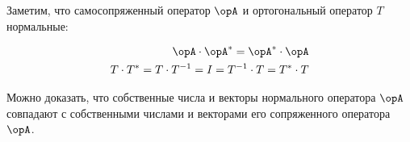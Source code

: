 \begin{remark}
  Заметим, что самосопряженный оператор \(\opA\) и ортогональный оператор
  \(T\) нормальные:

  \begin{align*}
    \opA \cdot \opA^* = \opA^* \cdot \opA
    \\
    T \cdot T^{*}
    = T \cdot T^{-1}
    = I
    =  T^{-1} \cdot T
    = T^{*} \cdot T
  \end{align*}
\end{remark}

\begin{remark}
  Можно доказать, что собственные числа и векторы нормального оператора \(\opA\)
  совпадают с собственными числами и векторами его сопряженного оператора
  \(\opA\).
\end{remark}